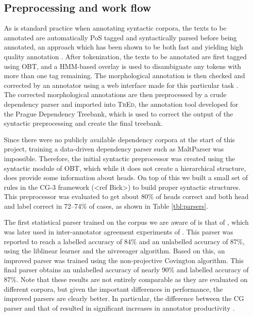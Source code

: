 \documentclass[11pt,a4paper]{article}
\let\app=\textsc
\begin{document}
\subsection{Preprocessing and work flow}
As is standard practice when annotating syntactic corpora, the texts to be
annotated are automatically PoS tagged and syntactically parsed before being
annotated, an approach which has been shown to be both fast and yielding
high quality annotation \cite{Mar:San:Mar:93,For:Sag:10,Skjaerholt:13}.
After tokenization, the texts to be annotated are first tagged using OBT, and
a HMM-based overlay \cite{Joh:Hag:No:Lyn:2011} is used to disambiguate any
tokens with more than one tag remaining. The morphological annotation is then
checked and corrected by an annotator using a web interface made for this
particular task \cite{Lyn:13}. The corrected morphological annotations are
then preprocessed by a crude dependency parser and imported into \app{TrEd}, the
annotation tool developed for the Prague Dependency Treebank, which is used to
correct the output of the syntactic preprocessing and create the final
treebank.

Since there were no publicly available dependency corpora at the start of this
project, training a data-driven dependency parser such as MaltParser was
impossible. Therefore, the initial syntactic preprocessor was created using
the syntactic module of OBT, which while it does not create a hierarchical
structure, does provide some information about heads. On top of this we built
a small set of rules in the CG-3 framework (<ref Bick>) to build proper
syntactic structures. This preprocessor was evaluated to get about 80\% of
heads correct and both head and label correct in 72--74\% of cases, as shown
in Table \ref{tbl:parsers}.

The first statistical parser trained on the corpus we are aware of is that of
, which was later used in inter-annotator agreement
experiments of . This parser was reported to reach a
labelled accuracy of 84\% and an unlabelled accuracy of 87\%, using the
liblinear learner and the nivreeager algorithm. Based on this, an improved
parser was trained using the non-projective Covington algorithm. This final
parser obtains an unlabelled accuracy of nearly 90\% and labelled accuracy of
87\%. Note that these results are not entirely comparable as they are evaluated
on different corpora, but given the important differences in performance, the
improved parsers are clearly better. In particular, the difference between the
CG parser and that of  resulted in significant increases in
annotator productivity \cite{Skjaerholt:13}.
\end{document}

